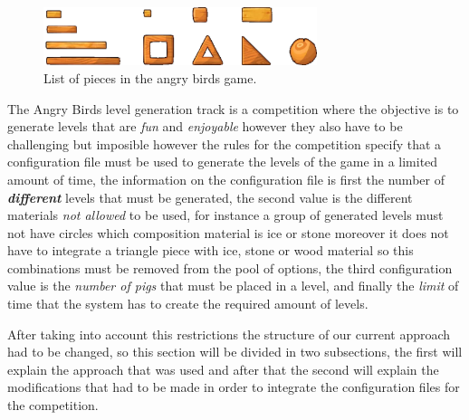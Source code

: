\documentclass[conference]{IEEEtran}
\begin{document}
\begin{figure}[htbp]
\centerline{\includegraphics[width=80mm]{Images/list_pieces.png}}
\caption{List of pieces in the angry birds game.}
\label{piece_list}
\end{figure}


The Angry Birds level generation track is a competition where the objective is 
to generate levels that are \textit{fun} and \textit{enjoyable} however they 
also have to be challenging but imposible however the rules for the competition 
specify that a configuration file must be used to
generate the levels of the game in a limited amount of time, the information on
the configuration file is first the number of \textbf{\textit{different}} levels
that must be generated, the second value is the different materials \textit{not
allowed} to be used, for instance a group of generated levels must not have
circles which composition material is ice or stone moreover it does not have to
integrate a triangle piece with ice, stone or wood material so this combinations
must be removed from the pool of options, the third configuration value is the
\textit{number of pigs} that must be placed in a level, and finally the
\textit{limit} of time that the system has to create the required amount of
levels.

After taking into account this restrictions the structure of our current approach
had to be changed, so this section will be divided in two subsections, the first
will explain the approach that was used and after that the second will explain the
modifications that had to be made in order to integrate the configuration files
for the competition. 
\end{document}
